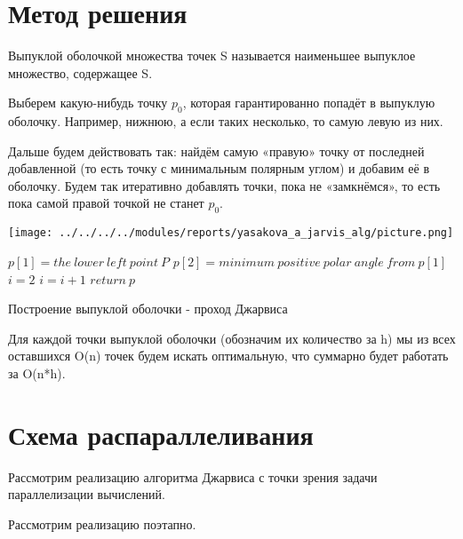 \documentclass{report}
\newenvironment{myalgorithm}[1][htb]
{\renewcommand{\algorithmcfname}{Алгоритм}
\begin{algorithm}[#1]%
}{\end{algorithm}}
\begin{document}
\newpage

\section{Метод решения}

Выпуклой оболочкой множества точек S называется наименьшее выпуклое множество, содержащее S.

\par Выберем какую-нибудь точку $p_{0}$, которая гарантированно попадёт в выпуклую оболочку. Например, нижнюю, а если таких несколько, то самую левую из них.

\par Дальше будем действовать так: найдём самую «правую» точку от последней добавленной (то есть точку с минимальным полярным углом) и добавим её в оболочку. Будем так итеративно добавлять точки, пока не «замкнёмся», то есть пока самой правой точкой не станет $p_{0}$.

\begin{center}
\captionsetup {type = figure}
\texttt{[image: ../../../../modules/reports/yasakova\_a\_jarvis\_alg/picture.png]}
\vspace{1ex}
\end{center} 

\begin{myalgorithm}[H]
\SetAlgoLined
\BlankLine
$p[1] = the\:lower\:left\:point\:P$\;
$p[2] =minimum\:positive\:polar\:angle\:from\:p[1]$\;
$i = 2$\;
\BlankLine
{} {
	$i = i + 1$\;
}
$return\:p$\;
\caption{Построение выпуклой оболочки - проход Джарвиса}
\end{myalgorithm}

\par Для каждой точки выпуклой оболочки (обозначим их количество за h) мы из всех оставшихся O(n) точек будем искать оптимальную, что суммарно будет работать за O(n*h).

\newpage

\section{Схема распараллеливания}

Рассмотрим реализацию алгоритма Джарвиса с точки зрения задачи параллелизации вычислений.

\par Рассмотрим реализацию поэтапно.
\end{document}
